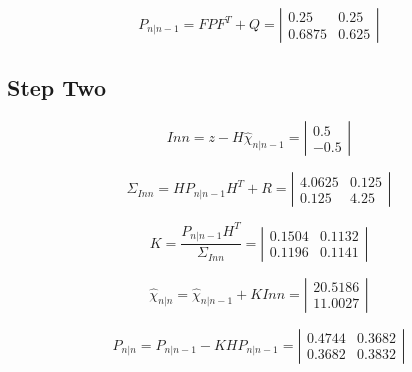 \documentclass[12pt]{article}
\begin{document}
\begin{equation}
P_{n|n-1}
=
FPF^T + Q
=
\left |  \begin{array}{cc}
0.25 & 0.25 \\
0.6875 & 0.625
\end{array}  \right |
\end{equation}

\subsection{Step Two}
\begin{equation}
Inn 
=
z - H\hat{\chi}_{n|n-1}
=
\left |  \begin{array}{c}
0.5 \\
-0.5
\end{array}  \right |
\end{equation}

\begin{equation}
\Sigma_{Inn}
=
H P_{n|n-1} H^T + R
=
\left |  \begin{array}{cc}
4.0625 & 0.125 \\
0.125 & 4.25
\end{array}  \right |
\end{equation}

\begin{equation}
K
=
\frac{P_{n|n-1} H^T}{\Sigma_{Inn}}
=
\left |  \begin{array}{cc}
0.1504 & 0.1132 \\
0.1196 & 0.1141
\end{array}  \right |
\end{equation}

\begin{equation}
\hat{\chi}_{n|n}
=
\hat{\chi}_{n|n-1} + KInn
=
\left |  \begin{array}{c}
20.5186 \\
11.0027
\end{array}  \right |
\end{equation}

\begin{equation}
P_{n|n}
=
P_{n|n-1} - K H P_{n|n-1}
=
\left |  \begin{array}{cc}
0.4744 & 0.3682 \\
0.3682 & 0.3832
\end{array}  \right |
\end{equation}


\pagebreak
\end{document}
